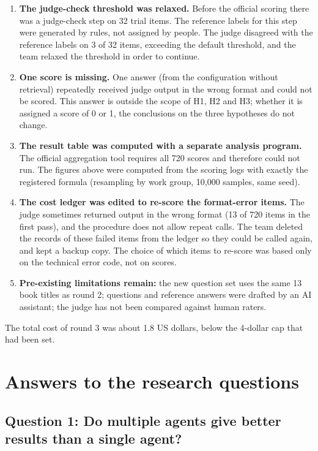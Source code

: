 \begin{enumerate}
    \item \textbf{The judge-check threshold was relaxed.} Before the official scoring there was a judge-check step on 32 trial items. The reference labels for this step were generated by rules, not assigned by people. The judge disagreed with the reference labels on 3 of 32 items, exceeding the default threshold, and the team relaxed the threshold in order to continue.
    \item \textbf{One score is missing.} One answer (from the configuration without retrieval) repeatedly received judge output in the wrong format and could not be scored. This answer is outside the scope of H1, H2 and H3; whether it is assigned a score of 0 or 1, the conclusions on the three hypotheses do not change.
    \item \textbf{The result table was computed with a separate analysis program.} The official aggregation tool requires all 720 scores and therefore could not run. The figures above were computed from the scoring logs with exactly the registered formula (resampling by work group, 10,000 samples, same seed).
    \item \textbf{The cost ledger was edited to re-score the format-error items.} The judge sometimes returned output in the wrong format (13 of 720 items in the first pass), and the procedure does not allow repeat calls. The team deleted the records of these failed items from the ledger so they could be called again, and kept a backup copy. The choice of which items to re-score was based only on the technical error code, not on scores.
    \item \textbf{Pre-existing limitations remain:} the new question set uses the same 13 book titles as round 2; questions and reference answers were drafted by an AI assistant; the judge has not been compared against human raters.
\end{enumerate}

The total cost of round 3 was about 1.8 US dollars, below the 4-dollar cap that had been set.

\section{Answers to the research questions}

\subsection{Question 1: Do multiple agents give better results than a single agent?}

